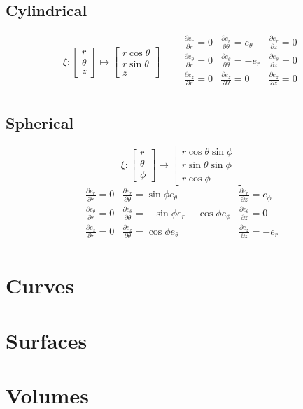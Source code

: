 \documentclass[a4paper, 11pt]{article}
\def\pp#1#2{\frac{\partial #1}{\partial #2}}
\begin{document}
\begin{multicols}{2}
	\subsection*{Cylindrical}
	\[
		\xi: \begin{bmatrix}
			r      \\
			\theta \\
			z
		\end{bmatrix} \mapsto \begin{bmatrix}
			r\cos\theta \\
			r\sin\theta \\
			z
		\end{bmatrix}
		\qquad
		\begin{array}{lll}
			\pp{e_r}{r} =0      & \pp{e_r}{\theta} =e_\theta  & \pp{e_r}{z} =0      \\
			\pp{e_\theta}{r} =0 & \pp{e_\theta}{\theta} =-e_r & \pp{e_\theta}{z} =0 \\
			\pp{e_z}{r} =0      & \pp{e_z}{\theta} =0         & \pp{e_z}{z} =0      \\
		\end{array}
	\]

	\subsection*{Spherical}
	\[
		\xi: \begin{bmatrix}
			r      \\
			\theta \\
			\phi
		\end{bmatrix}
		\mapsto
		\begin{bmatrix}
			r\cos\theta\sin\phi \\
			r\sin\theta\sin\phi \\
			r\cos\phi
		\end{bmatrix}
	\]
	\[
		\begin{array}{lll}
			\pp{e_r}{r}      =0 & \pp{e_r}{\theta} =\sin\phi e_\theta                   & \pp{e_r}{z} =e_\phi \\
			\pp{e_\theta}{r} =0 & \pp{e_\theta}{\theta} =-\sin\phi e_r -\cos\phi e_\phi & \pp{e_\theta}{z} =0 \\
			\pp{e_z}{r}      =0 & \pp{e_z}{\theta} =\cos\phi e_\theta                   & \pp{e_z}{z} =-e_r   \\
		\end{array}
	\]
	\section*{Curves}
	\section*{Surfaces}
	\section*{Volumes}



\end{multicols}
\end{document}
